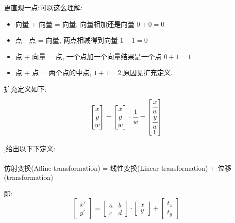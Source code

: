 \documentclass[UTF8,12pt]{ctexbook}
\begin{document}
{{{{{        更直观一点:可以这么理解:
        \begin{itemize}
          \item 向量 + 向量 = 向量, 向量相加还是向量 $0 + 0 = 0$
          \item 点 - 点 = 向量, 两点相减得到向量 $1 - 1 = 0$
          \item 点 + 向量 = 点, 一个点加一个向量结果是一个点 $0 + 1 = 1$
          \item 点 + 点 = 两个点的中点, $1 + 1 = 2$,原因见扩充定义.
        \end{itemize}
        扩充定义如下:
        $$\begin{bmatrix}
            x \\
            y \\
            w
          \end{bmatrix} = \begin{bmatrix}
            x \\
            y \\
            w
          \end{bmatrix}\cdot\cfrac{1}{w} = \begin{bmatrix}
            \cfrac{x}{w} \\
            \cfrac{y}{w} \\
            1
          \end{bmatrix}$$

        {,给出以下下定义:}\\\\\indent
        仿射变换(Affine transformation) = 线性变换(Linear transformation) + 位移(transformation)

        即:
        $$\begin{bmatrix}
            x\prime \\
            y\prime
          \end{bmatrix}
          =
          \begin{bmatrix}
            a & b \\
            c & d
          \end{bmatrix}
          \cdot
          \begin{bmatrix}
            x \\
            y
          \end{bmatrix}
          +
          \begin{bmatrix}
            t_x \\
            t_y
          \end{bmatrix}$$

}}}}}
\end{document}
